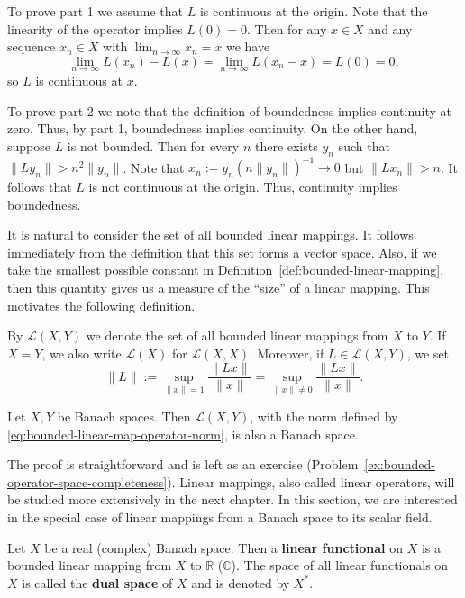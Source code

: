 \begin{Proof}
To prove part 1 we assume that $L$ is continuous at the origin. Note that the linearity of the operator implies $L(0)=0$. Then for any $x\in X$ and any sequence $x_n\in X$ with $\lim_{n\to\infty}x_n=x$ we have
\begin{equation}\label{eq:linear-map-continuity-at-origin-translation}
\lim_{n\to\infty}L(x_n)-L(x)=\lim_{n\to\infty}L(x_n-x)=L(0)=0,
\end{equation}
so $L$ is continuous at $x$.

To prove part 2 we note that the definition of boundedness implies continuity at zero. Thus, by part 1, boundedness implies continuity. On the other hand, suppose $L$ is not bounded. Then for every $n$ there exists $y_n$ such that $\|Ly_n\|>n^2\|y_n\|$. Note that $x_n:=y_n(n\|y_n\|)^{-1}\to0$ but $\|Lx_n\|>n$. It follows that $L$ is not continuous at the origin. Thus, continuity implies boundedness.
\end{Proof}

It is natural to consider the set of all bounded linear mappings. It follows immediately from the definition that this set forms a vector space. Also, if we take the smallest possible constant in Definition~\ref{def:bounded-linear-mapping}, then this quantity gives us a measure of the ``size'' of a linear mapping. This motivates the following definition.

\begin{Definition}
\label{def:bounded-operator-space-norm}
By $\mathcal{L}(X,Y)$ we denote the set of all bounded linear mappings from $X$ to $Y$. If $X=Y$, we also write $\mathcal{L}(X)$ for $\mathcal{L}(X,X)$. Moreover, if $L\in\mathcal{L}(X,Y)$, we set
\begin{equation}\label{eq:bounded-linear-map-operator-norm}
\|L\|:=\sup_{\|x\|=1}\dfrac{\|Lx\|}{\|x\|}=\sup_{\|x\|\ne0}\dfrac{\|Lx\|}{\|x\|}.
\end{equation}

\end{Definition}

\begin{Theorem}
\label{thm:bounded-operator-space-completeness}
Let $X,Y$ be Banach spaces. Then $\mathcal{L}(X,Y)$, with the norm defined by \eqref{eq:bounded-linear-map-operator-norm}, is also a Banach space.
\end{Theorem}

The proof is straightforward and is left as an exercise (Problem~\ref{ex:bounded-operator-space-completeness}). Linear mappings, also called linear operators, will be studied more extensively in the next chapter. In this section, we are interested in the special case of linear mappings from a Banach space to its scalar field.

\begin{Definition}
\label{def:linear-functional-dual-space}
Let $X$ be a real (complex) Banach space. Then a \textbf{linear functional} on $X$ is a bounded linear mapping from $X$ to $\mathbb{R}$ ($\mathbb{C}$). The space of all linear functionals on $X$ is called the \textbf{dual space} of $X$ and is denoted by $X^*$.
\end{Definition}
